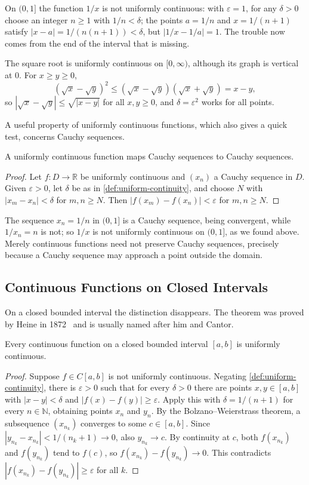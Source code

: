 On $(0,1]$ the function $1/x$ is not uniformly continuous: with $\varepsilon=1$, for any $\delta>0$ choose an integer $n\ge1$ with $1/n<\delta$; the points $a=1/n$ and $x=1/(n+1)$ satisfy $|x-a|=1/(n(n+1))<\delta$, but $|1/x-1/a|=1$. The trouble now comes from the end of the interval that is missing.

The square root is uniformly continuous on $[0,\infty)$, although its graph is vertical at $0$. For $x\ge y\ge0$,
\[
(\sqrt x-\sqrt y)^2\le(\sqrt x-\sqrt y)(\sqrt x+\sqrt y)=x-y ,
\]
so $|\sqrt x-\sqrt y|\le\sqrt{|x-y|}$ for all $x,y\ge0$, and $\delta=\varepsilon^2$ works for all points.

A useful property of uniformly continuous functions, which also gives a quick test, concerns Cauchy sequences.

\begin{proposition}
\label{prop:uniform-cauchy}
A uniformly continuous function maps Cauchy sequences to Cauchy sequences.
\end{proposition}

\begin{proof}
Let $f\colon D\to\mathbb R$ be uniformly continuous and $(x_n)$ a Cauchy sequence in $D$. Given $\varepsilon>0$, let $\delta$ be as in \cref{def:uniform-continuity}, and choose $N$ with $|x_m-x_n|<\delta$ for $m,n\ge N$. Then $|f(x_m)-f(x_n)|<\varepsilon$ for $m,n\ge N$.
\end{proof}

The sequence $x_n=1/n$ in $(0,1]$ is a Cauchy sequence, being convergent, while $1/x_n=n$ is not; so $1/x$ is not uniformly continuous on $(0,1]$, as we found above. Merely continuous functions need not preserve Cauchy sequences, precisely because a Cauchy sequence may approach a point outside the domain.

\subsection{Continuous Functions on Closed Intervals}

On a closed bounded interval the distinction disappears. The theorem was proved by Heine in 1872~\cite{heine1872} and is usually named after him and Cantor.

\begin{theorem}
\label{thm:heine-cantor}
Every continuous function on a closed bounded interval $[a,b]$ is uniformly continuous.
\end{theorem}

\begin{proof}
Suppose $f\in C[a,b]$ is not uniformly continuous. Negating \cref{def:uniform-continuity}, there is $\varepsilon>0$ such that for every $\delta>0$ there are points $x,y\in[a,b]$ with $|x-y|<\delta$ and $|f(x)-f(y)|\ge\varepsilon$. Apply this with $\delta=1/(n+1)$ for every $n\in\mathbb N$, obtaining points $x_n$ and $y_n$. By the Bolzano--Weierstrass theorem, a subsequence $(x_{n_k})$ converges to some $c\in[a,b]$. Since $|y_{n_k}-x_{n_k}|<1/(n_k+1)\to0$, also $y_{n_k}\to c$. By continuity at $c$, both $f(x_{n_k})$ and $f(y_{n_k})$ tend to $f(c)$, so $f(x_{n_k})-f(y_{n_k})\to0$. This contradicts $|f(x_{n_k})-f(y_{n_k})|\ge\varepsilon$ for all $k$.
\end{proof}


